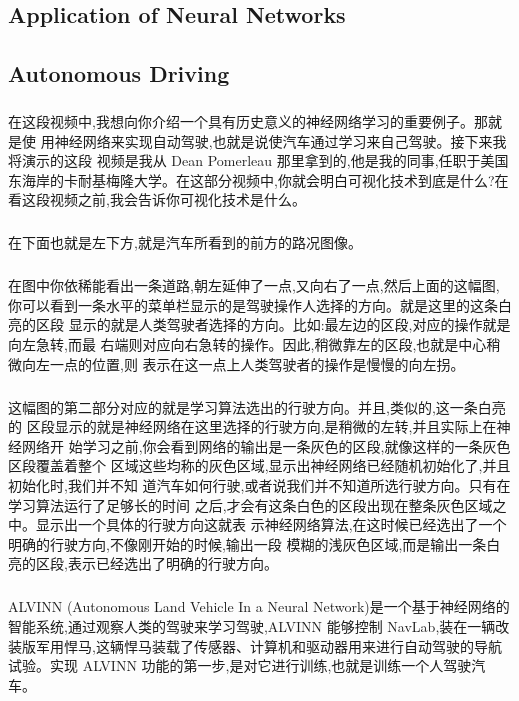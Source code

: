 \documentclass{article}
\begin{document}
\begin{CJK}{UTF8}{gbsn}
\section{Application of Neural Networks}
\subsection{Autonomous Driving}
\subparagraph{}
在这段视频中,我想向你介绍一个具有历史意义的神经网络学习的重要例子。那就是使
用神经网络来实现自动驾驶,也就是说使汽车通过学习来自己驾驶。接下来我将演示的这段
视频是我从 Dean Pomerleau 那里拿到的,他是我的同事,任职于美国东海岸的卡耐基梅隆大学。在这部分视频中,你就会明白可视化技术到底是什么?在看这段视频之前,我会告诉你可视化技术是什么。
\subparagraph{}
在下面也就是左下方,就是汽车所看到的前方的路况图像。
\begin{figure}[H]
\label{fig:5555}
\end{figure}
\subparagraph{}
在图中你依稀能看出一条道路,朝左延伸了一点,又向右了一点,然后上面的这幅图,
你可以看到一条水平的菜单栏显示的是驾驶操作人选择的方向。就是这里的这条白亮的区段
显示的就是人类驾驶者选择的方向。比如:最左边的区段,对应的操作就是向左急转,而最
右端则对应向右急转的操作。因此,稍微靠左的区段,也就是中心稍微向左一点的位置,则
表示在这一点上人类驾驶者的操作是慢慢的向左拐。
\subparagraph{}
这幅图的第二部分对应的就是学习算法选出的行驶方向。并且,类似的,这一条白亮的
区段显示的就是神经网络在这里选择的行驶方向,是稍微的左转,并且实际上在神经网络开
始学习之前,你会看到网络的输出是一条灰色的区段,就像这样的一条灰色区段覆盖着整个
区域这些均称的灰色区域,显示出神经网络已经随机初始化了,并且初始化时,我们并不知
道汽车如何行驶,或者说我们并不知道所选行驶方向。只有在学习算法运行了足够长的时间
之后,才会有这条白色的区段出现在整条灰色区域之中。显示出一个具体的行驶方向这就表
示神经网络算法,在这时候已经选出了一个明确的行驶方向,不像刚开始的时候,输出一段
模糊的浅灰色区域,而是输出一条白亮的区段,表示已经选出了明确的行驶方向。
\begin{figure}[H]
\label{fig:5557}
\end{figure}
\subparagraph{}
ALVINN (Autonomous Land Vehicle In a Neural Network)是一个基于神经网络的智能系统,通过观察人类的驾驶来学习驾驶,ALVINN 能够控制 NavLab,装在一辆改装版军用悍马,这辆悍马装载了传感器、计算机和驱动器用来进行自动驾驶的导航试验。实现 ALVINN 功能的第一步,是对它进行训练,也就是训练一个人驾驶汽车。
\begin{figure}[H]

\end{figure}
\end{CJK}
\end{document}
